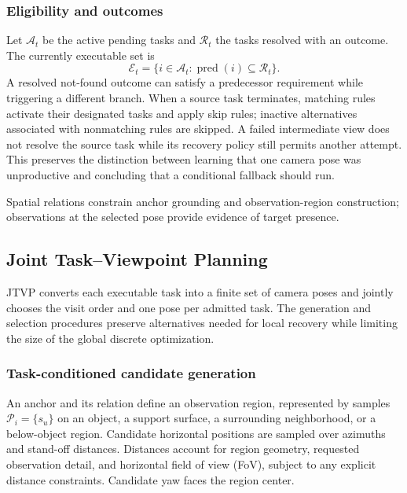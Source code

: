 \documentclass[letterpaper,10pt,journal]{IEEEtran}
\begin{document}
\subsubsection{Eligibility and outcomes}
Let $\mathcal A_t$ be the active pending tasks and $\mathcal R_t$ the tasks resolved with an outcome. The currently executable set is
\begin{equation}
\mathcal E_t=\{i\in\mathcal A_t:\operatorname{pred}(i)\subseteq\mathcal R_t\}.
\label{eq:eligible}
\end{equation}
A resolved not-found outcome can satisfy a predecessor requirement while triggering a different branch. When a source task terminates, matching rules activate their designated tasks and apply skip rules; inactive alternatives associated with nonmatching rules are skipped. A failed intermediate view does not resolve the source task while its recovery policy still permits another attempt. This preserves the distinction between learning that one camera pose was unproductive and concluding that a conditional fallback should run.

Spatial relations constrain anchor grounding and observation-region construction; observations at the selected pose provide evidence of target presence.

\subsection{Joint Task--Viewpoint Planning}
\label{sec:jtvp}
JTVP converts each executable task into a finite set of camera poses and jointly chooses the visit order and one pose per admitted task. The generation and selection procedures preserve alternatives needed for local recovery while limiting the size of the global discrete optimization.

\subsubsection{Task-conditioned candidate generation}
An anchor and its relation define an observation region, represented by samples $\mathcal P_i=\{s_u\}$ on an object, a support surface, a surrounding neighborhood, or a below-object region. Candidate horizontal positions are sampled over azimuths and stand-off distances. Distances account for region geometry, requested observation detail, and horizontal field of view (FoV), subject to any explicit distance constraints. Candidate yaw faces the region center.
\end{document}
